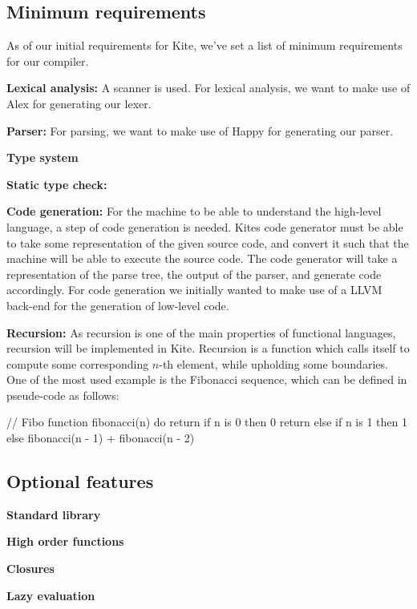 
\subsection{Minimum requirements}
As of our initial requirements for Kite, we've set a list of minimum
requirements for our compiler.

\textbf{Lexical analysis:} A scanner is used. For lexical analysis, we
want to make use of Alex for generating our lexer.

\textbf{Parser:} For parsing, we want to make use of Happy for
generating our parser.

\textbf{Type system}

\textbf{Static type check:} 

\textbf{Code generation:} For the machine to be able to understand the
high-level language, a step of code generation is needed. Kites code
generator must be able to take some representation of the given source
code, and convert it such that the machine will be able to execute the
source code. The code generator will take a representation of the
parse tree, the output of the parser, and generate code
accordingly. For code generation we initially wanted to make use of a
LLVM back-end for the generation of low-level code. 

\textbf{Recursion:} As recursion is one of the main properties of
functional languages, recursion will be implemented in Kite. Recursion
is a function which calls itself to compute some corresponding $n$-th
element, while upholding some boundaries. One of the most used example
is the Fibonacci sequence, which can be defined in pseude-code as
follows:
\begin{pseudo}
// Fibo
function fibonacci(n) do
  return if n is 0
    then 0
  return else if n is 1
    then 1
  else fibonacci(n - 1) + fibonacci(n - 2)

\end{pseudo}

\subsection{Optional features}

\textbf{Standard library}

\textbf{High order functions}

\textbf{Closures}

\textbf{Lazy evaluation}


